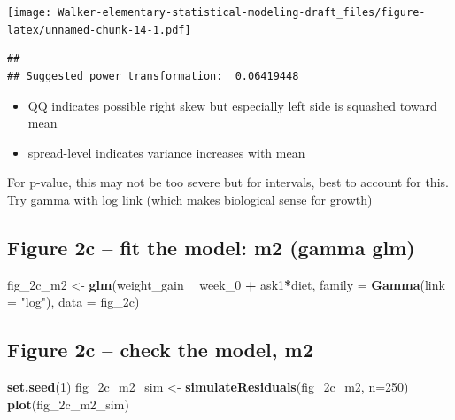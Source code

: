 \documentclass[]{book}
\newenvironment{Shaded}{\begin{snugshade}}{\end{snugshade}}
\newcommand{\DataTypeTok}[1]{\textcolor[rgb]{0.13,0.29,0.53}{#1}}
\newcommand{\DecValTok}[1]{\textcolor[rgb]{0.00,0.00,0.81}{#1}}
\newcommand{\KeywordTok}[1]{\textcolor[rgb]{0.13,0.29,0.53}{\textbf{#1}}}
\newcommand{\NormalTok}[1]{#1}
\newcommand{\OperatorTok}[1]{\textcolor[rgb]{0.81,0.36,0.00}{\textbf{#1}}}
\newcommand{\StringTok}[1]{\textcolor[rgb]{0.31,0.60,0.02}{#1}}
\providecommand{\tightlist}{%
  \setlength{\itemsep}{0pt}\setlength{\parskip}{0pt}}
\begin{document}
\texttt{[image: Walker-elementary-statistical-modeling-draft\_files/figure-latex/unnamed-chunk-14-1.pdf]}

\begin{verbatim}
## 
## Suggested power transformation:  0.06419448
\end{verbatim}

\begin{itemize}
\tightlist
\item
  QQ indicates possible right skew but especially left side is squashed toward mean
\item
  spread-level indicates variance increases with mean
\end{itemize}

For p-value, this may not be too severe but for intervals, best to account for this. Try gamma with log link (which makes biological sense for growth)

\hypertarget{figure-2c-fit-the-model-m2-gamma-glm}{%
\subsection{Figure 2c -- fit the model: m2 (gamma glm)}\label{figure-2c-fit-the-model-m2-gamma-glm}}

\begin{Shaded}
\begin{Highlighting}[]
\NormalTok{fig_2c_m2 <-}\StringTok{ }\KeywordTok{glm}\NormalTok{(weight_gain }\OperatorTok{~}\StringTok{ }\NormalTok{week_}\DecValTok{0} \OperatorTok{+}\StringTok{ }\NormalTok{ask1}\OperatorTok{*}\NormalTok{diet,}
          \DataTypeTok{family =} \KeywordTok{Gamma}\NormalTok{(}\DataTypeTok{link =} \StringTok{"log"}\NormalTok{),}
          \DataTypeTok{data =}\NormalTok{ fig_2c)}
\end{Highlighting}
\end{Shaded}

\hypertarget{figure-2c-check-the-model-m2}{%
\subsection{Figure 2c -- check the model, m2}\label{figure-2c-check-the-model-m2}}

\begin{Shaded}
\begin{Highlighting}[]
\KeywordTok{set.seed}\NormalTok{(}\DecValTok{1}\NormalTok{)}
\NormalTok{fig_2c_m2_sim  <-}\StringTok{  }\KeywordTok{simulateResiduals}\NormalTok{(fig_2c_m2,  }\DataTypeTok{n=}\DecValTok{250}\NormalTok{)}
\KeywordTok{plot}\NormalTok{(fig_2c_m2_sim) }
\end{Highlighting}
\end{Shaded}
\end{document}
